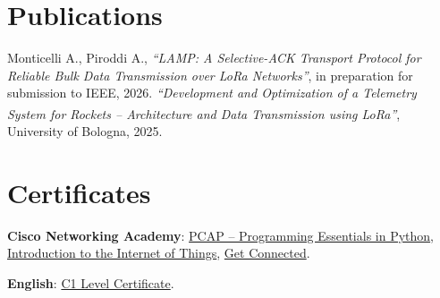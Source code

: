 \documentclass[letterpaper,11pt,english]{article}
\begin{document}
\section{Publications}
\resumeSubHeadingListStart
{}
{Monticelli A., Piroddi A., \textit{“LAMP: A Selective-ACK Transport Protocol for Reliable Bulk Data Transmission over LoRa Networks”}, in preparation for submission to IEEE, 2026.}
{\textit{“Development and Optimization of a Telemetry System for Rockets – Architecture and Data Transmission using LoRa\textsuperscript{\textcopyright}”}, University of Bologna, 2025.}
\resumeSubHeadingListEnd

\section{Certificates}
\resumeSubHeadingListStart
\item \textbf{Cisco Networking Academy}{: \href{https://github.com/aleemont1/curriculum-vitae/blob/main/certificates/PYTHON-2020_certificate.pdf}{PCAP -- Programming Essentials in Python}, \href{https://github.com/aleemont1/curriculum-vitae/blob/main/certificates/IOT-2018_certificate.pdf}{Introduction to the Internet of Things}, \href{https://github.com/aleemont1/curriculum-vitae/blob/main/certificates/GetConnected-2017_certificate.pdf}{Get Connected}.}
\item \textbf{English}{: \href{https://github.com/aleemont1/curriculum-vitae/blob/main/certificates/English_C1.pdf}{C1 Level Certificate}.}
\resumeSubHeadingListEnd
\cvsignatureblock
\end{document}
